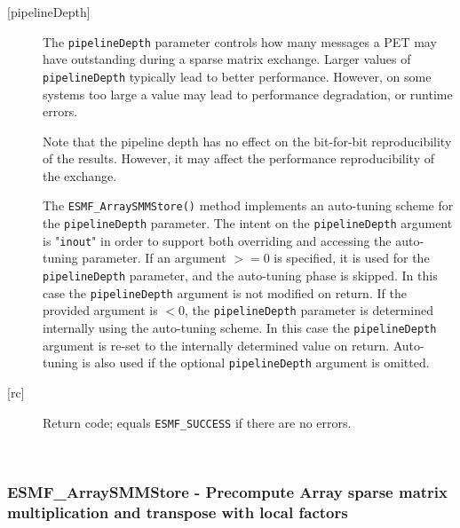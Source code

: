 \begin{description}
     \item [{[pipelineDepth]}]
       The {\tt pipelineDepth} parameter controls how many messages a PET
       may have outstanding during a sparse matrix exchange. Larger values
       of {\tt pipelineDepth} typically lead to better performance. However,
       on some systems too large a value may lead to performance degradation,
       or runtime errors.
  
       Note that the pipeline depth has no effect on the bit-for-bit
       reproducibility of the results. However, it may affect the performance
       reproducibility of the exchange.
  
       The {\tt ESMF\_ArraySMMStore()} method implements an auto-tuning scheme
       for the {\tt pipelineDepth} parameter. The intent on the 
       {\tt pipelineDepth} argument is "{\tt inout}" in order to 
       support both overriding and accessing the auto-tuning parameter.
       If an argument $>= 0$ is specified, it is used for the 
       {\tt pipelineDepth} parameter, and the auto-tuning phase is skipped.
       In this case the {\tt pipelineDepth} argument is not modified on
       return. If the provided argument is $< 0$, the {\tt pipelineDepth}
       parameter is determined internally using the auto-tuning scheme. In this
       case the {\tt pipelineDepth} argument is re-set to the internally
       determined value on return. Auto-tuning is also used if the optional 
       {\tt pipelineDepth} argument is omitted.
       
     \item [{[rc]}]
       Return code; equals {\tt ESMF\_SUCCESS} if there are no errors.
     \end{description}
   
 
\mbox{}\hrulefill\ 
 
\subsubsection [ESMF\_ArraySMMStore] {ESMF\_ArraySMMStore - Precompute Array sparse matrix multiplication and transpose with local factors}


